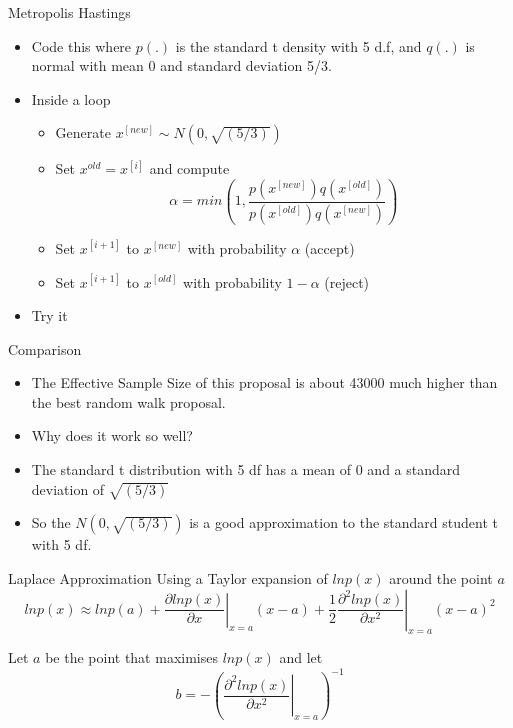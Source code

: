 \documentclass[10pt]{beamer}
\begin{document}
\begin{frame}{Metropolis Hastings}
\begin{itemize}
\item Code this where $p(.)$ is the standard t density with 5 d.f, and $q(.)$ is normal with mean 0 and standard deviation 5/3.

\item Inside a loop
\begin{itemize}
  \item Generate $x^{[new]}\sim N(0,\sqrt{(5/3)})$
  \item Set $x^{old}=x^{[i]}$ and compute
  \begin{equation}
  \alpha=min\left(1,\frac{p(x^{[new]})q(x^{[old]})}{p(x^{[old]})q(x^{[new]})}\right)
  \end{equation}
  \item Set $x^{[i+1]}$ to $x^{[new]}$ with probability $\alpha$ (accept)
  \item Set $x^{[i+1]}$ to $x^{[old]}$ with probability $1-\alpha$ (reject)
\end{itemize}

\item Try it
\end{itemize}
\end{frame}
\begin{frame}{Comparison}
\begin{itemize}
\item The Effective Sample Size of this proposal is about 43000 much higher than the best random walk proposal.

\item Why does it work so well?

\item The standard t distribution with 5 df has a mean of 0 and a standard deviation of $\sqrt{(5/3)}$

\item So the $N(0,\sqrt{(5/3)})$ is a good approximation to the standard student t with 5 df.
\end{itemize}
\end{frame}
\begin{frame}{Laplace Approximation}
Using a Taylor expansion of $lnp(x)$ around the point $a$
\begin{equation*}
lnp(x)\approx lnp(a)+\left.\frac{\partial lnp(x)}{\partial x}\right|_{x=a}(x-a)
+\frac{1}{2}\left.\frac{\partial^2 lnp(x)}{\partial x^2}\right|_{x=a}(x-a)^2
\end{equation*}

Let $a$ be the point that maximises $ln p(x)$ and let
\begin{equation}
b=-\left(\left.\frac{\partial^2 lnp(x)}{\partial x^2}\right|_{x=a}\right)^{-1}
\end{equation}
\end{frame}
\end{document}
